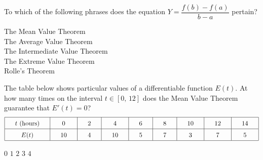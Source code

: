 \begin{questions}
    \question To which of the following phrases does the equation $Y = \dfrac{f(b) - f(a)}{b - a}$ pertain? \\

    \begin{oneparchoices}
        \choice The Mean Value Theorem \\[11pt]
        \makebox[0.035\textwidth] \choice The Average Value Theorem \\[11pt]
        \makebox[0.035\textwidth] \choice The Intermediate Value Theorem \\[11pt]
        \makebox[0.035\textwidth] \choice The Extreme Value Theorem \\[11pt]
        \makebox[0.035\textwidth] \choice Rolle's Theorem
    \end{oneparchoices} \par \horizontalline

    \question The table below shows particular values of a differentiable function $E(t)$. At how many times on the interval $t \in [0, \, 12]$ does the Mean Value Theorem guarantee that $E'(t) = 0$? \begin{align*}
        \arraycolsep=16.5pt\def\arraystretch{1.5}
        \begin{array}{|c|c|c|c|c|c|c|c|c|}
            \hline
            t \text{ (hours)} & 0 & 2 & 4 & 6 & 8 & 10 & 12 & 14 \\ \hline
            E(t) & 10 & 4 & 10 & 5 & 7 & 3 & 7 & 5 \\
            \hline
        \end{array}
    \end{align*}

    \begin{oneparchoices}
        \choice $0$
        \choice $1$
        \choice $2$
        \choice $3$
        \choice $4$
    \end{oneparchoices} \par \horizontalline
\end{questions}

